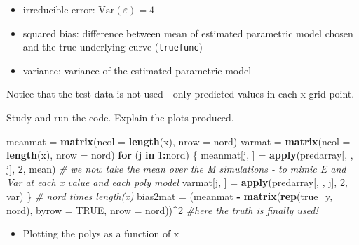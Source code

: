 \documentclass[]{article}
\newenvironment{Shaded}{\begin{snugshade}}{\end{snugshade}}
\newcommand{\CommentTok}[1]{\textcolor[rgb]{0.56,0.35,0.01}{\textit{#1}}}
\newcommand{\ControlFlowTok}[1]{\textcolor[rgb]{0.13,0.29,0.53}{\textbf{#1}}}
\newcommand{\DataTypeTok}[1]{\textcolor[rgb]{0.13,0.29,0.53}{#1}}
\newcommand{\DecValTok}[1]{\textcolor[rgb]{0.00,0.00,0.81}{#1}}
\newcommand{\KeywordTok}[1]{\textcolor[rgb]{0.13,0.29,0.53}{\textbf{#1}}}
\newcommand{\NormalTok}[1]{#1}
\newcommand{\OperatorTok}[1]{\textcolor[rgb]{0.81,0.36,0.00}{\textbf{#1}}}
\newcommand{\OtherTok}[1]{\textcolor[rgb]{0.56,0.35,0.01}{#1}}
\newcommand{\StringTok}[1]{\textcolor[rgb]{0.31,0.60,0.02}{#1}}
\providecommand{\tightlist}{%
  \setlength{\itemsep}{0pt}\setlength{\parskip}{0pt}}
\begin{document}
\begin{itemize}
\tightlist
\item
  irreducible error: \(\text{Var}(\varepsilon)=4\)
\item
  squared bias: difference between mean of estimated parametric model
  chosen and the true underlying curve (\texttt{truefunc})
\item
  variance: variance of the estimated parametric model
\end{itemize}

Notice that the test data is not used - only predicted values in each x
grid point.

Study and run the code. Explain the plots produced.

\begin{Shaded}
\begin{Highlighting}[]
\NormalTok{meanmat =}\StringTok{ }\KeywordTok{matrix}\NormalTok{(}\DataTypeTok{ncol =} \KeywordTok{length}\NormalTok{(x), }\DataTypeTok{nrow =}\NormalTok{ nord)}
\NormalTok{varmat =}\StringTok{ }\KeywordTok{matrix}\NormalTok{(}\DataTypeTok{ncol =} \KeywordTok{length}\NormalTok{(x), }\DataTypeTok{nrow =}\NormalTok{ nord)}
\ControlFlowTok{for}\NormalTok{ (j }\ControlFlowTok{in} \DecValTok{1}\OperatorTok{:}\NormalTok{nord) \{}
\NormalTok{    meanmat[j, ] =}\StringTok{ }\KeywordTok{apply}\NormalTok{(predarray[, , j], }\DecValTok{2}\NormalTok{, mean)  }\CommentTok{# we now take the mean over the M simulations - to mimic E and Var at each x value and each poly model}
\NormalTok{    varmat[j, ] =}\StringTok{ }\KeywordTok{apply}\NormalTok{(predarray[, , j], }\DecValTok{2}\NormalTok{, var)}
\NormalTok{\}}
\CommentTok{# nord times length(x)}
\NormalTok{bias2mat =}\StringTok{ }\NormalTok{(meanmat }\OperatorTok{-}\StringTok{ }\KeywordTok{matrix}\NormalTok{(}\KeywordTok{rep}\NormalTok{(true_y, nord), }\DataTypeTok{byrow =} \OtherTok{TRUE}\NormalTok{, }\DataTypeTok{nrow =}\NormalTok{ nord))}\OperatorTok{^}\DecValTok{2}  \CommentTok{#here the truth is finally used!}
\end{Highlighting}
\end{Shaded}

\begin{itemize}
\tightlist
\item
  Plotting the polys as a function of x
\end{itemize}
\end{document}
